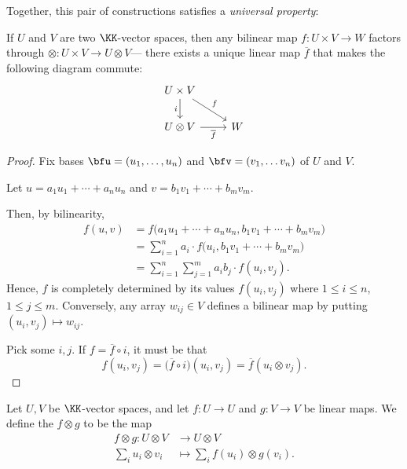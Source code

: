 \documentclass{article}
\begin{document}
Together, this pair of constructions satisfies a \textit{universal property}:

\begin{theorem}
    If $U$ and $V$ are two $\KK$-vector spaces, then any bilinear map $f: U \times V \to W$ factors through $\otimes: U \times V \to U \otimes V$--- there exists a unique linear map $\overline{f}$ that makes the following diagram commute:
    \[
        \begin{tikzcd}
            U \times V \arrow[rd, "f"] \arrow[d, "i"'] \\ 
            U \otimes V \arrow[r, "\overline{f}"'] & W
        \end{tikzcd}
    \]
\end{theorem}

\begin{proof}
    Fix bases $\bfu = (u_1, \ldots, u_n)$ and $\bfv = (v_1, \ldots v_n)$ of $U$ and $V$.

    Let $u = a_1u_1 + \cdots + a_nu_n$ and $v = b_1v_1 + \cdots + b_mv_m$.

    Then, by bilinearity,
    \begin{align*}
        f(u, v)
        &=
        f\Big(
            a_1u_1 + \cdots + a_nu_n,
            b_1v_1 + \cdots + b_mv_m
        \Big)
        \\
        &=
        \sum_{i=1}^n
        a_i
        \cdot
        f\Big(
            u_i,
            b_1v_1 + \cdots + b_mv_m
        \Big)
        \\
        &=
        \sum_{i=1}^n
        \sum_{j=1}^m
        a_i
        b_j
        \cdot
        f(u_i,v_j).
    \end{align*}
    Hence, $f$ is completely determined by its values $f(u_i,v_j)$ where $1 \leq i \leq n$, $1 \leq j \leq m$.
    Conversely, any array $w_{ij} \in V$ defines a bilinear map by putting $(u_i,v_j) \mapsto w_{ij}$.

    Pick some $i,j$.
    If $f = \overline{f} \circ i$, it must be that
    \[
        f(u_i, v_j)
        =
        \Big(\overline{f} \circ i\Big)(u_i, v_j)
        =
        \overline{f}(u_i \otimes v_j).
    \]
\end{proof}

\begin{definition}
    Let $U, V$ be $\KK$-vector spaces, and let $f: U \to U$ and $g: V \to V$ be linear maps.
    We define the  $f \otimes g$ to be the map
    \begin{align*}
        f \otimes g:
        U \otimes V
        &\to
        U \otimes V
        \\
        \sum_i
        u_i \otimes v_i
        &\mapsto
        \sum_i
        f(u_i) \otimes g(v_i).
    \end{align*}
\end{definition}
\end{document}
